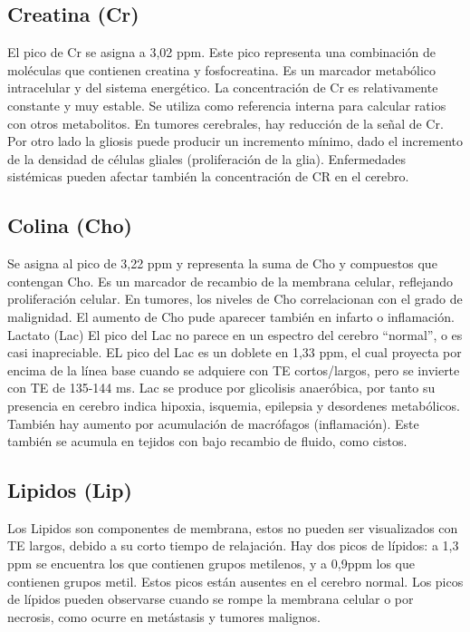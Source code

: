 \subsection{Creatina (Cr)}
El pico de Cr se asigna a 3,02 ppm. Este pico representa una combinación de moléculas que contienen  creatina y fosfocreatina. Es un marcador metabólico intracelular y del sistema energético. La concentración de Cr es relativamente constante y muy estable. Se utiliza como referencia interna para calcular ratios con otros metabolitos.
En tumores cerebrales, hay reducción de la señal de Cr. Por otro lado la gliosis puede producir un incremento mínimo, dado el incremento de la densidad de células gliales (proliferación de la glia). Enfermedades sistémicas pueden afectar también la concentración de CR en el cerebro.

\subsection{Colina (Cho)}
Se asigna al pico de 3,22 ppm y representa la suma de Cho y compuestos que contengan Cho. Es un marcador de recambio de la membrana celular, reflejando proliferación celular. En tumores, los niveles de Cho correlacionan con el grado de malignidad. El aumento de Cho pude aparecer también en infarto o inflamación.
Lactato (Lac)
El pico del Lac no parece en un espectro del cerebro “normal”, o es casi inapreciable. EL pico del Lac es un doblete en 1,33 ppm, el cual proyecta por encima de la línea base cuando se adquiere con TE cortos/largos, pero se invierte con TE de 135-144 ms. Lac se produce por glicolisis anaeróbica, por tanto su presencia en cerebro indica hipoxia, isquemia, epilepsia y desordenes metabólicos. También hay aumento por acumulación de macrófagos (inflamación). Este también se acumula en tejidos con bajo recambio de fluido, como cistos.

\subsection{Lipidos (Lip)}
Los Lipidos son componentes de membrana, estos no pueden ser visualizados con TE largos, debido a su corto tiempo de relajación. Hay dos picos de lípidos: a 1,3 ppm se encuentra los que contienen grupos metilenos, y a 0,9ppm los que contienen grupos metil. Estos picos están ausentes en el cerebro normal. Los picos de lípidos pueden observarse cuando se rompe la membrana celular o por necrosis, como ocurre en metástasis y tumores malignos.

